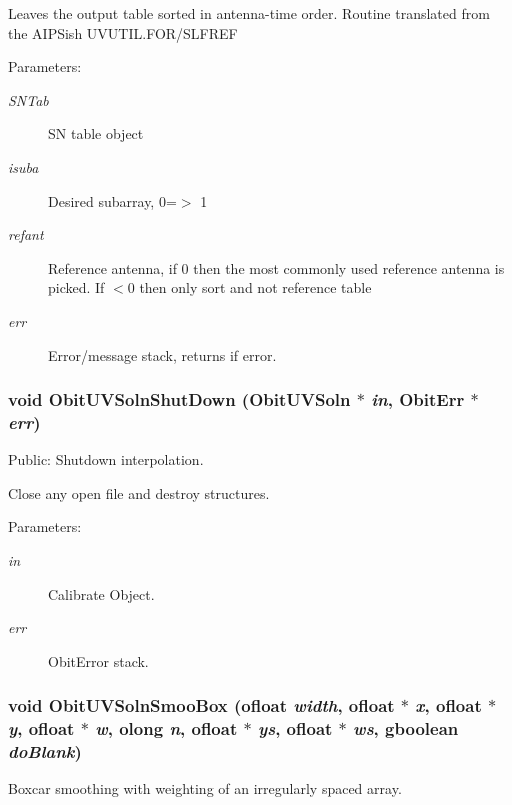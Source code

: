 Leaves the output table sorted in antenna-time order. Routine translated from the AIPSish UVUTIL.FOR/SLFREF \begin{Desc}
\item[Parameters:]
\begin{description}
\item[{\em SNTab}]SN table object \item[{\em isuba}]Desired subarray, 0=$>$ 1 \item[{\em refant}]Reference antenna, if 0 then the most commonly used reference antenna is picked. If $<$0 then only sort and not reference table \item[{\em err}]Error/message stack, returns if error. \end{description}
\end{Desc}
\subsubsection{\setlength{\rightskip}{0pt plus 5cm}void Obit\-UVSoln\-Shut\-Down ({\bf Obit\-UVSoln} $\ast$ {\em in}, {\bf Obit\-Err} $\ast$ {\em err})}\label{ObitUVSoln_8c_a25}


Public: Shutdown interpolation. 

Close any open file and destroy structures. \begin{Desc}
\item[Parameters:]
\begin{description}
\item[{\em in}]Calibrate Object. \item[{\em err}]Obit\-Error stack. \end{description}
\end{Desc}
\subsubsection{\setlength{\rightskip}{0pt plus 5cm}void Obit\-UVSoln\-Smoo\-Box ({\bf ofloat} {\em width}, {\bf ofloat} $\ast$ {\em x}, {\bf ofloat} $\ast$ {\em y}, {\bf ofloat} $\ast$ {\em w}, {\bf olong} {\em n}, {\bf ofloat} $\ast$ {\em ys}, {\bf ofloat} $\ast$ {\em ws}, gboolean {\em do\-Blank})}\label{ObitUVSoln_8c_a32}


Boxcar smoothing with weighting of an irregularly spaced array. 


